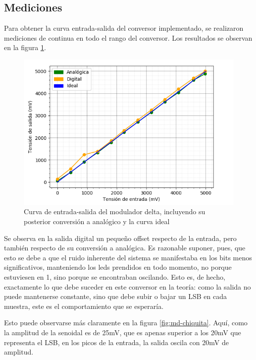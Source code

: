 \documentclass[assd_tp3_main.tex]{subfiles}
\begin{document}
\subsection{Mediciones}

Para obtener la curva entrada-salida del conversor implementado, se realizaron mediciones de continua en todo el rango del conversor. Los resultados se observan en la figura \ref{fig:md-continua}.

\begin{figure}[!htb]
	\centering
	\includegraphics[width = \textwidth]
	{images/ej3/md-continua.png}
	\caption{Curva de entrada-salida del modulador delta, incluyendo su posterior conversi\'on a anal\'ogico y la curva ideal}
	\label{fig:md-continua}
\end{figure}

Se observa en la salida digital un peque\~no offset respecto de la entrada, pero tambi\'en respecto de su conversi\'on a anal\'ogica. Es razonable suponer, pues, que esto se debe a que el ruido inherente del sistema se manifestaba en los bits menos significativos, manteniendo los leds prendidos en todo momento, no porque estuviesen en 1, sino porque se encontraban oscilando.  Esto es, de hecho, exactamente lo que debe suceder en este conversor en la teor\'ia: como la salida no puede mantenerse constante, sino que debe subir o bajar un LSB en cada muestra, este es el comportamiento que se esperar\'ia.

Esto puede observarse m\'as claramente en la figura \ref{fig:md-chiquita}. Aqu\'i, como la amplitud de la senoidal es de 25mV, que es apenas superior a los 20mV que representa el LSB, en los picos de la entrada, la salida oscila con 20mV de amplitud.
\end{document}
